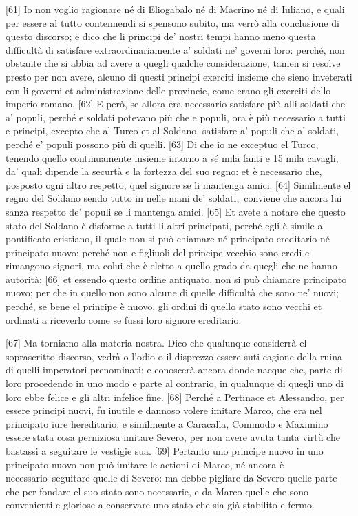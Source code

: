 {[}61{]} Io non voglio ragionare né di Eliogabalo né di Macrino né di
Iuliano, e quali per essere al tutto contennendi si spensono subito, ma
verrò alla conclusione di questo discorso; e dico che li principi de'
nostri tempi hanno meno questa difficultà di satisfare
extraordinariamente a' soldati ne' governi loro: perché, non obstante
che si abbia ad avere a quegli qualche considerazione, tamen si resolve
presto per non avere, alcuno di questi principi exerciti insieme che
sieno inveterati con li governi et administrazione delle provincie, come
erano gli exerciti dello imperio romano. {[}62{]} E però, se allora era
necessario satisfare più alli soldati che a' populi, perché e soldati
potevano più che e populi, ora è più necessario a tutti e principi,
excepto che al Turco et al Soldano, satisfare a' populi che a' soldati,
perché e' populi possono più di quelli. {[}63{]} Di che io ne exceptuo
el Turco, tenendo quello continuamente insieme intorno a sé  mila
fanti e 15 mila cavagli, da' quali dipende la securtà e la fortezza del
suo regno: et è necessario che, posposto ogni altro respetto, quel
signore se li mantenga amici. {[}64{]} Similmente el regno del Soldano
sendo tutto in nelle mani de' soldati,\est\ conviene che ancora lui sanza
respetto de' populi se li mantenga amici. {[}65{]} Et avete a notare che
questo stato del Soldano è disforme a tutti li altri principati, perché
egli è simile al pontificato cristiano, il quale non si può chiamare né
principato ereditario né principato nuovo: perché non e figliuoli del
principe vecchio sono eredi e rimangono signori, ma colui che è eletto a
quello grado da quegli che ne hanno autorità; {[}66{]} et essendo questo
ordine antiquato, non si può chiamare principato nuovo; per che in
quello non sono alcune di quelle difficultà che sono ne' nuovi; perché,
se bene el principe è nuovo, gli ordini di quello stato sono vecchi et
ordinati a riceverlo come se fussi loro signore ereditario.


{[}67{]} Ma torniamo alla materia nostra. Dico che qualunque considerrà
el soprascritto discorso, vedrà o l'odio o il disprezzo essere suti
cagione della ruina di quelli imperatori prenominati; e conoscerà ancora
donde nacque che, parte di loro procedendo in uno modo e parte al
contrario, in qualunque di quegli uno di loro ebbe felice e gli altri
infelice fine. {[}68{]} Perché a Pertinace et Alessandro, per essere
principi nuovi, fu inutile e dannoso volere imitare Marco, che era nel
principato iure hereditario; e similmente a Caracalla, Commodo e
Maximino essere stata cosa perniziosa imitare Severo, per non avere
avuta tanta virtù che bastassi a seguitare le vestigie sua. {[}69{]}
Pertanto uno principe nuovo in uno principato nuovo non può imitare le
actioni di Marco, né ancora è necessario\est\ seguitare quelle di Severo: ma
debbe pigliare da Severo quelle parte che per fondare el suo stato sono
necessarie, e da Marco quelle che sono convenienti e gloriose a
conservare uno stato che sia già stabilito e fermo.

